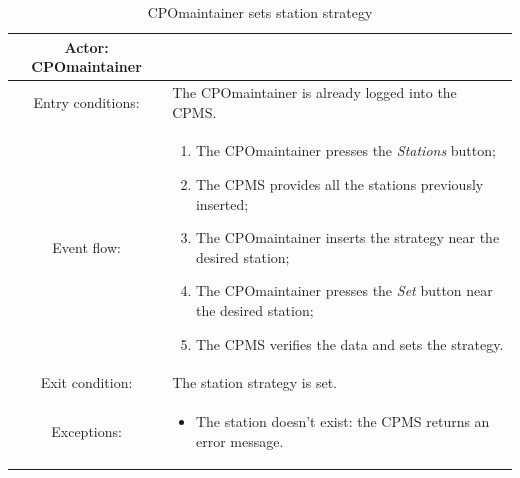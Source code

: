 \begin{table}[h]
    \begin{center}
        \begin{tabular}{|c||p{10cm}|}
            \hline
            Actor: \ac{CPO}maintainer &                                                              \\
            \hline
            Entry conditions:         & The \ac{CPO}maintainer is already logged into the \ac{CPMS}. \\
            \hline
            Event flow:               &
            \begin{enumerate}
                \item The \ac{CPO}maintainer presses the \textit{Stations} button;
                \item The \ac{CPMS} provides all the stations previously inserted;
                \item The \ac{CPO}maintainer inserts the strategy near the desired station;
                \item The \ac{CPO}maintainer presses the \textit{Set} button near the desired station;
                \item The \ac{CPMS} verifies the data and sets the strategy.
            \end{enumerate}
            \\
            \hline
            Exit condition:           & The station strategy is set.                                 \\
            \hline
            Exceptions:               &
            \begin{itemize}
                \item The station doesn't exist: the \ac{CPMS} returns an error message.
            \end{itemize}
            \\
            \hline
        \end{tabular}
    \end{center}
    \caption{\ac{CPO}maintainer sets station strategy}
\end{table}

